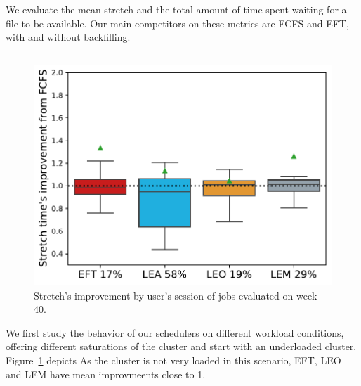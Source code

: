 \documentclass[sigconf,review,anonymous]{acmart}
\newcommand{\rev}[1]{{\color{blue}{#1}}}
\begin{document}
We evaluate the mean stretch and the total amount of time spent waiting for a file to be available.
Our main competitors on these metrics are FCFS and EFT, with and without backfilling.


\subsection{\rev{Performance on an underutilized cluster}}\label{sec.underutilized}

\begin{figure}[t]\centering\includegraphics[width=0.9\linewidth]{../MBSS/plot/Boxplot/byuser/box_plot_stretch_10-03-10-09_0.pdf}\caption{Stretch's improvement by user's session of jobs evaluated on week 40.}\label{stretch.40}\end{figure}

We first study the behavior of our schedulers on different workload conditions,
offering different saturations of the cluster and start with an
underloaded cluster.
Figure~\ref{stretch.40} depicts \rev{the distribution of stretch of user's sessions obtained by each strategy.
In this figure, the horizontal black dotted line corresponds to no improvements from FCFS, which
is the situation where the sum of the queue time and transfer time of the job is the same as with FCFS.
The solid line is the median and the triangle symbolize the mean improvement.}
As the cluster is not very loaded in this scenario, EFT, LEO and LEM have mean improvmeents close to 1.
\end{document}
